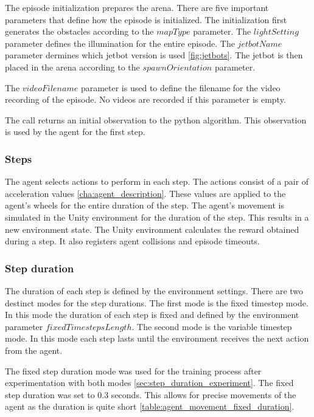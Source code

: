 The episode initialization prepares the arena. There are five important parameters that define how the episode is initialized. The initialization first generates the obstacles according to the $mapType$ parameter. The $lightSetting$ parameter defines the illumination for the entire episode.
The $jetbotName$ parameter dermines which jetbot version is used \ref{fig:jetbots}. The jetbot is then placed in the arena according to the $spawnOrientation$ parameter.

The $videoFilename$ parameter is used to define the filename for the video recording of the episode. No videos are recorded if this parameter is empty.

The call returns an initial observation to the python algorithm. This observation is used by the agent for the first step.

\subsubsection{Steps}

The agent selects actions to perform in each step. The actions consist of a pair of acceleration values \ref{cha:agent_description}. These values are applied to the agent's wheels for the entire duration of the step. The agent's movement is simulated in the Unity environment for the duration of the step. This results in a new environment state.
The Unity environment calculates the reward obtained during a step. It also registers agent collisions and episode timeouts.


\subsubsection{Step duration}
\label{sec:step_duration}

The duration of each step is defined by the environment settings. There are two destinct modes for the step durations. The first mode is the fixed timestep mode. In this mode the duration of each step is fixed and defined by the environment parameter $fixedTimestepsLength$. The second mode is the variable timestep mode. In this mode each step lasts until the environment receives the next action from the agent.

The fixed step duration mode was used for the training process after experimentation with both modes \ref{sec:step_duration_experiment}. The fixed step duration was set to 0.3 seconds. This allows for precise movements of the agent as the duration is quite short \ref{table:agent_movement_fixed_duration}.


